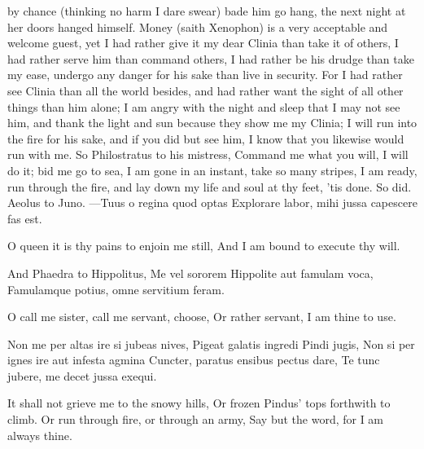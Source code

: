 {by chance (thinking no harm I dare swear) bade him go hang, the next
night at her doors hanged himself. Money (saith Xenophon) is a
very acceptable and welcome guest, yet I had rather give it my dear
Clinia than take it of others, I had rather serve him than command
others, I had rather be his drudge than take my ease, undergo any
danger for his sake than live in security. For I had rather see Clinia
than all the world besides, and had rather want the sight of all other
things than him alone; I am angry with the night and sleep that I may
not see him, and thank the light and sun because they show me my
Clinia; I will run into the fire for his sake, and if you did but see
him, I know that you likewise would run with me. So Philostratus to his
mistress, Command me what you will, I will do it; bid me go to
sea, I am gone in an instant, take so many stripes, I am ready, run
through the fire, and lay down my life and soul at thy feet, 'tis done.
So did. Aeolus to Juno.
---Tuus o regina quod optas
Explorare labor, mihi jussa capescere fas est.

O queen it is thy pains to enjoin me still,
And I am bound to execute thy will.

And Phaedra to Hippolitus,
Me vel sororem Hippolite aut famulam voca,
Famulamque potius, omne servitium feram.

O call me sister, call me servant, choose,
Or rather servant, I am thine to use.

Non me per altas ire si jubeas nives,
Pigeat galatis ingredi Pindi jugis,
Non si per ignes ire aut infesta agmina
Cuncter, paratus ensibus pectus dare,
Te tunc jubere, me decet jussa exequi.

It shall not grieve me to the snowy hills,
Or frozen Pindus' tops forthwith to climb.
Or run through fire, or through an army,
Say but the word, for I am always thine.

}
